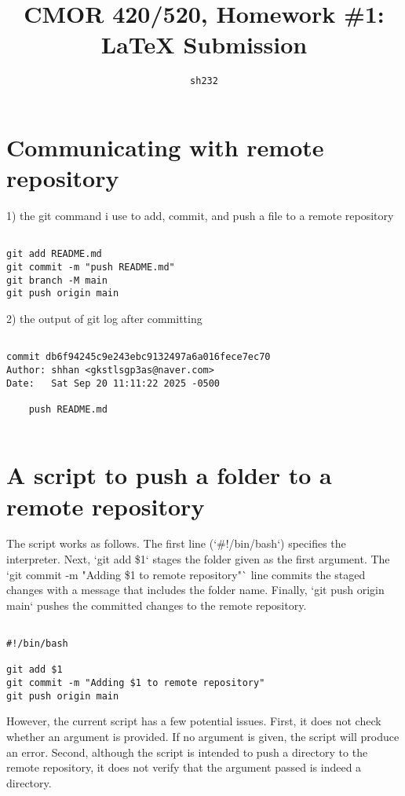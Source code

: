 \documentclass[10pt,letterpaper]{article}
\author{\texttt{sh232}}
\title{CMOR 420/520, Homework \#1: \LaTeX{} Submission}
\theoremstyle{definition}
\theoremstyle{definition}
\begin{document}
\maketitle

\section{Communicating with remote repository}

1) the git command i use to add, commit, and push a file to a remote repository
\begin{verbatim}

git add README.md
git commit -m "push README.md"
git branch -M main
git push origin main

\end{verbatim}

2) the output of git log after committing
\begin{verbatim}

commit db6f94245c9e243ebc9132497a6a016fece7ec70
Author: shhan <gkstlsgp3as@naver.com>
Date:   Sat Sep 20 11:11:22 2025 -0500

    push README.md
    
\end{verbatim}

\section{A script to push a folder to a remote repository}

The script works as follows. The first line (`\#!/bin/bash`) specifies the interpreter. 
Next, `git add \$1` stages the folder given as the first argument. 
The `git commit -m "Adding \$1 to remote repository"` line commits the staged changes with a message that includes the folder name. 
Finally, `git push origin main` pushes the committed changes to the remote repository.


\begin{lstlisting}[caption={A script to push a folder to a remote repository}, label={lst:gitpush}]

#!/bin/bash

git add $1
git commit -m "Adding $1 to remote repository"
git push origin main

\end{lstlisting}

However, the current script has a few potential issues. First, it does not check whether an argument is provided. If no argument is given, the script will produce an error. Second, although the script is intended to push a directory to the remote repository, it does not verify that the argument passed is indeed a directory.
\end{document}
